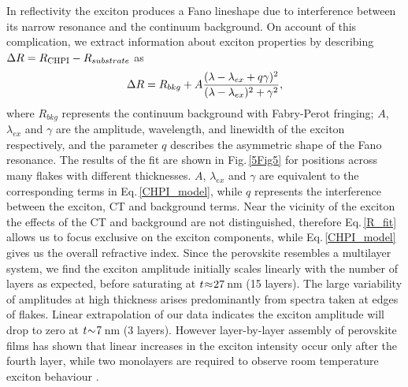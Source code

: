In reflectivity the exciton produces a Fano lineshape due to interference between its narrow resonance and the continuum background. On account of this complication, we extract information about exciton properties by describing $\Delta R = R_{\textnormal{CHPI}} - R_{substrate}$ as
\begin{equation}
\centering
\Delta R = R_{bkg} + A\frac{(\lambda - \lambda_{ex} + q\gamma)^2}{(\lambda - \lambda_{ex})^2 + \gamma^2} , 
\label{R_fit}
\end{equation}
where $R_{bkg}$ represents the continuum background with Fabry-Perot fringing; $A$, $\lambda_{ex}$ and $\gamma$ are the amplitude, wavelength, and linewidth of the exciton respectively, and the parameter $q$ describes the asymmetric shape of the Fano resonance. The results of the fit are shown in Fig.\,\ref{5Fig5} for positions across many flakes with different thicknesses. $A$, $\lambda_{ex}$ and $\gamma$ are equivalent to the corresponding terms in Eq.\,\ref{CHPI_model}, while $q$ represents the interference between the exciton, CT and background terms. Near the vicinity of the exciton the effects of the CT and background are not distinguished, therefore Eq.\,\ref{R_fit} allows us to focus exclusive on the exciton components, while Eq.\,\ref{CHPI_model} gives us the overall refractive index. Since the perovskite resembles a multilayer system, we find the exciton amplitude initially scales linearly with the number of layers as expected, before saturating at $t\negmedspace\approx\negmedspace27$\,nm (15 layers). The large variability of amplitudes at high thickness arises predominantly from spectra taken at edges of flakes. Linear extrapolation of our data indicates the exciton amplitude will drop to zero at $t\negmedspace\sim\negmedspace7$\,nm (3 layers). However layer-by-layer assembly of perovskite films has shown that linear increases in the exciton intensity occur only after the fourth layer, while two monolayers are required to observe room temperature exciton behaviour \cite{Matsui2002}. 

